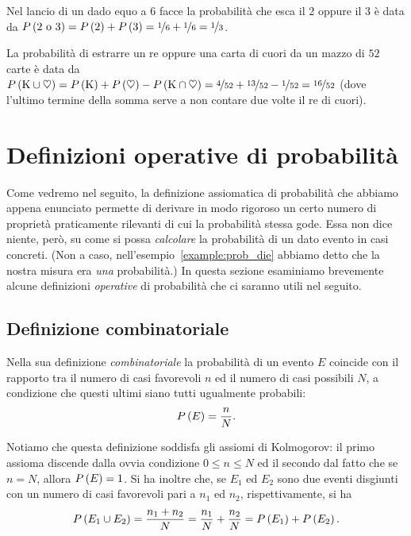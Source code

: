 \begin{examplebox}
  \begin{example}
    Nel lancio di un dado equo a 6 facce la probabilità che esca il $2$
    oppure il $3$ è data da
    $\displaystyle P\left(2~\text{o}~3\right) = \displaystyle P\left(2\right) + \displaystyle P\left(3\right) =
    \nicefrac{1}{6} + \nicefrac{1}{6} = \nicefrac{1}{3}$.
  \end{example}

  \begin{example}
    La probabilità di estrarre un re oppure una carta di cuori da un mazzo
    di $52$ carte è data da
    $\displaystyle P\left(\text{K} \cup \heartsuit\right) =
    \displaystyle P\left(\text{K}\right) + \displaystyle P\left(\heartsuit\right) - \displaystyle P\left(\text{K} \cap \heartsuit\right) =
    \nicefrac{4}{52} + \nicefrac{13}{52} - \nicefrac{1}{52} = \nicefrac{16}{52}$
    (dove l'ultimo termine della somma serve a non contare due volte il
    re di cuori).
  \end{example}
\end{examplebox}


\section{Definizioni operative di probabilità}

Come vedremo nel seguito, la definizione assiomatica di probabilità che
abbiamo appena enunciato permette di derivare in modo rigoroso un certo
numero di proprietà praticamente rilevanti di cui la probabilità stessa
gode. Essa non dice niente, però, su come si possa \emph{calcolare} la
probabilità di un dato evento in casi concreti. (Non a caso,
nell'esempio~\ref{example:prob_die} abbiamo detto che la nostra misura era
\emph{una} probabilità.) In questa sezione esaminiamo brevemente alcune
definizioni \emph{operative} di probabilità che ci saranno utili nel seguito.


\subsection{Definizione combinatoriale}

Nella sua definizione \emph{combinatoriale} la probabilità di un evento $E$
coincide con il rapporto tra il numero di casi favorevoli $n$ ed il numero di
casi possibili $N$, a condizione che questi ultimi siano tutti ugualmente
probabili:
\begin{align}\label{eq:prob_comb}
  \displaystyle P\left(E\right) = \frac{n}{N}.
\end{align}

Notiamo che questa definizione soddisfa gli assiomi di Kolmogorov: il primo
assioma discende dalla ovvia condizione $0 \leq n \leq N$ ed il secondo dal
fatto che se $n = N$, allora $\displaystyle P\left(E\right) = 1$. Si ha inoltre che, se $E_1$ ed
$E_2$ sono due eventi disgiunti con un numero di casi favorevoli pari a
$n_1$ ed $n_2$, rispettivamente, si ha
\begin{align*}
  \displaystyle P\left(E_1 \cup E_2\right) = \frac{n_1 + n_2}{N} = \frac{n_1}{N} + \frac{n_2}{N} =
  \displaystyle P\left(E_1\right) + \displaystyle P\left(E_2\right).
\end{align*}

